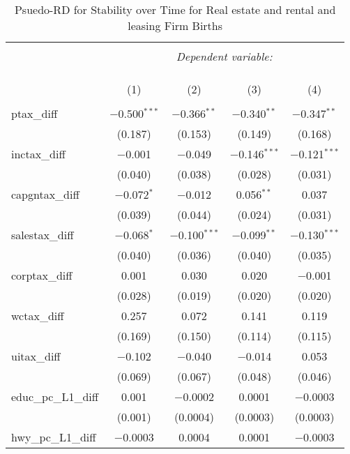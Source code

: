 
\begin{table}[!htbp] \centering 
  \caption{Psuedo-RD for Stability over Time for  Real estate and rental and leasing Firm Births} 
  \label{} 
\begin{tabular}{@{\extracolsep{5pt}}lcccc} 
\\[-1.8ex]\hline 
\hline \\[-1.8ex] 
 & \multicolumn{4}{c}{\textit{Dependent variable:}} \\ 
\cline{2-5} 
\\[-1.8ex] & \multicolumn{4}{c}{ } \\ 
\\[-1.8ex] & (1) & (2) & (3) & (4)\\ 
\hline \\[-1.8ex] 
 ptax\_diff & $-$0.500$^{***}$ & $-$0.366$^{**}$ & $-$0.340$^{**}$ & $-$0.347$^{**}$ \\ 
  & (0.187) & (0.153) & (0.149) & (0.168) \\ 
  inctax\_diff & $-$0.001 & $-$0.049 & $-$0.146$^{***}$ & $-$0.121$^{***}$ \\ 
  & (0.040) & (0.038) & (0.028) & (0.031) \\ 
  capgntax\_diff & $-$0.072$^{*}$ & $-$0.012 & 0.056$^{**}$ & 0.037 \\ 
  & (0.039) & (0.044) & (0.024) & (0.031) \\ 
  salestax\_diff & $-$0.068$^{*}$ & $-$0.100$^{***}$ & $-$0.099$^{**}$ & $-$0.130$^{***}$ \\ 
  & (0.040) & (0.036) & (0.040) & (0.035) \\ 
  corptax\_diff & 0.001 & 0.030 & 0.020 & $-$0.001 \\ 
  & (0.028) & (0.019) & (0.020) & (0.020) \\ 
  wctax\_diff & 0.257 & 0.072 & 0.141 & 0.119 \\ 
  & (0.169) & (0.150) & (0.114) & (0.115) \\ 
  uitax\_diff & $-$0.102 & $-$0.040 & $-$0.014 & 0.053 \\ 
  & (0.069) & (0.067) & (0.048) & (0.046) \\ 
  educ\_pc\_L1\_diff & 0.001 & $-$0.0002 & 0.0001 & $-$0.0003 \\ 
  & (0.001) & (0.0004) & (0.0003) & (0.0003) \\ 
  hwy\_pc\_L1\_diff & $-$0.0003 & 0.0004 & 0.0001 & $-$0.0003 \\ 

\end{tabular}
\end{table}
